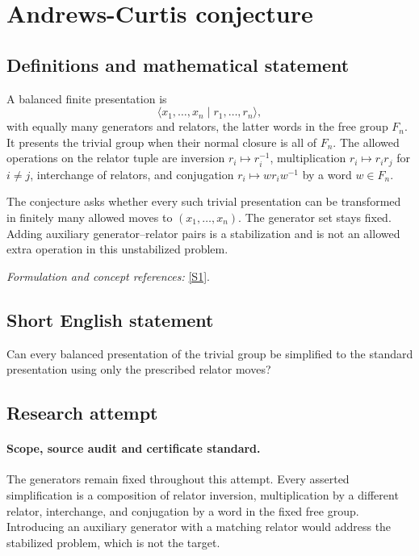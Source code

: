 \documentclass[11pt]{article}
\begin{document}
\section*{\texorpdfstring{Andrews-Curtis conjecture}{Andrews-Curtis conjecture}}\label{456}
\subsection{Definitions and mathematical statement}
A balanced finite presentation is
\[
 \langle x_1,\ldots,x_n\mid r_1,\ldots,r_n\rangle,
\]
with equally many generators and relators, the latter words in the free group $F_n$. It presents the trivial group when their normal closure is all of $F_n$. The allowed operations on the relator tuple are inversion $r_i\mapsto r_i^{-1}$, multiplication $r_i\mapsto r_ir_j$ for $i\ne j$, interchange of relators, and conjugation $r_i\mapsto w r_iw^{-1}$ by a word $w\in F_n$.

The conjecture asks whether every such trivial presentation can be transformed in finitely many allowed moves to $(x_1,\ldots,x_n)$. The generator set stays fixed. Adding auxiliary generator--relator pairs is a stabilization and is not an allowed extra operation in this unstabilized problem.
\par\smallskip\textit{Formulation and concept references:} \href{https://link.springer.com/article/10.1007/s10817-026-09759-8}{[S1]}.

\subsection{Short English statement}
Can every balanced presentation of the trivial group be simplified to the standard presentation using only the prescribed relator moves?
\subsection{Research attempt}

\paragraph{Scope, source audit and certificate standard.}
The generators remain fixed throughout this attempt. Every asserted
simplification is a composition of relator inversion, multiplication
by a different relator, interchange, and conjugation by a word in the
fixed free group. Introducing an auxiliary generator with a matching
relator would address the stabilized problem, which is not the target.
\end{document}
